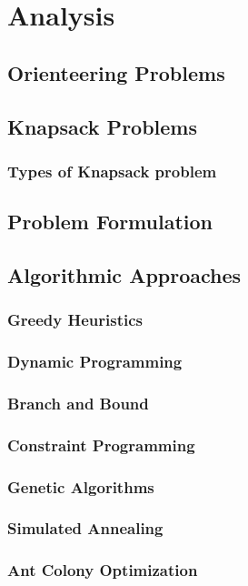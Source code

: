 \chapter{Analysis}\label{chapter:analysis}

\section{Orienteering Problems}

\section{Knapsack Problems}
\subsection{Types of Knapsack problem}

\section{Problem Formulation}

\section{Algorithmic Approaches}
\subsection{Greedy Heuristics}
\subsection{Dynamic Programming}
\subsection{Branch and Bound}
\subsection{Constraint Programming}
\subsection{Genetic Algorithms}
\subsection{Simulated Annealing}
\subsection{Ant Colony Optimization}

